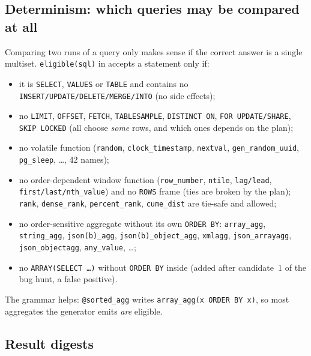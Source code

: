 \subsection{Determinism: which queries may be compared at all}
\label{sec:eligible}

Comparing two runs of a query only makes sense if the correct answer is a
single multiset. \texttt{eligible(sql)} in 
accepts a statement only if:
\begin{itemize}
  \item it is \texttt{SELECT}, \texttt{VALUES} or \texttt{TABLE} and contains no
    \texttt{INSERT/UPDATE/DELETE/MERGE/INTO} (no side effects);
  \item no \texttt{LIMIT}, \texttt{OFFSET}, \texttt{FETCH}, \texttt{TABLESAMPLE},
    \texttt{DISTINCT ON}, \texttt{FOR UPDATE/SHARE}, \texttt{SKIP LOCKED}
    (all choose \emph{some} rows, and which ones depends on the plan);
  \item no volatile function (\texttt{random}, \texttt{clock\_timestamp},
    \texttt{nextval}, \texttt{gen\_random\_uuid}, \texttt{pg\_sleep}, \dots, 42 names);
  \item no order-dependent window function (\texttt{row\_number}, \texttt{ntile},
    \texttt{lag/lead}, \texttt{first/last/nth\_value}) and no \texttt{ROWS}
    frame (ties are broken by the plan); \texttt{rank}, \texttt{dense\_rank},
    \texttt{percent\_rank}, \texttt{cume\_dist} are tie-safe and allowed;
  \item no order-sensitive aggregate without its own \texttt{ORDER BY}:
    \texttt{array\_agg}, \texttt{string\_agg}, \texttt{json(b)\_agg},
    \texttt{json(b)\_object\_agg}, \texttt{xmlagg}, \texttt{json\_arrayagg},
    \texttt{json\_objectagg}, \texttt{any\_value}, \dots;
  \item no \texttt{ARRAY(SELECT \dots)} without \texttt{ORDER BY} inside
    (added after candidate~1 of the bug hunt, a false positive).
\end{itemize}
The grammar helps: \texttt{@sorted\_agg} writes \texttt{array\_agg(x ORDER BY
x)}, so most aggregates the generator emits \emph{are} eligible.

\subsection{Result digests}
\label{sec:digest}

